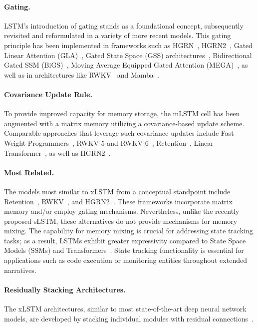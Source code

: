 \paragraph{Gating.}
LSTM's introduction of gating stands as a foundational concept, subsequently revisited and reformulated in a variety of more recent models. This gating principle has been implemented in frameworks such as HGRN~\citep{Qin:23}, HGRN2~\citep{Qin:24arxiv}, Gated Linear Attention (GLA)~\citep{Yang:23arxiv}, Gated State Space (GSS) architectures~\citep{Mehta:22}, Bidirectional Gated SSM (BiGS)~\citep{Wang:22}, Moving Average Equipped Gated Attention (MEGA)~\citep{Ma:22}, as well as in architectures like RWKV~\citep{Peng:23arxivshort} and Mamba~\citep{Gu:24arxiv}.

\paragraph{Covariance Update Rule.}
To provide improved capacity for memory storage, the mLSTM cell has been augmented with a matrix memory utilizing a covariance-based update scheme. Comparable approaches that leverage such covariance updates include Fast Weight Programmers~\citep{Schmidhuber:92ncfastweights,Schlag:21}, RWKV-5 and RWKV-6~\citep{Peng:24arxivshort}, Retention~\citep{Sun:23arxiv}, Linear Transformer~\citep{Katharopoulos:20}, as well as HGRN2~\citep{Qin:24arxiv}.

\paragraph{Most Related.} The models most similar to xLSTM from a conceptual standpoint include Retention~\citep{Sun:23arxiv}, RWKV~\citep{Peng:23arxivshort,Peng:24arxivshort}, and HGRN2~\citep{Qin:24arxiv}. These frameworks incorporate matrix memory and/or employ gating mechanisms. Nevertheless, unlike the recently proposed sLSTM, these alternatives do not provide mechanisms for memory mixing. The capability for memory mixing is crucial for addressing state tracking tasks; as a result, LSTMs exhibit greater expressivity compared to State Space Models (SSMs) and Transformers~\citep{Merrill:24,Deletang:23}. State tracking functionality is essential for applications such as code execution or monitoring entities throughout extended narratives.

\paragraph{Residually Stacking Architectures.} The xLSTM architectures, similar to most state-of-the-art deep neural network models, are developed by stacking individual modules with residual connections~\citep{Srivastava:15,He:16}.

